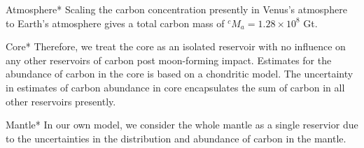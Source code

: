 
Atmosphere*
Scaling the carbon concentration presently in Venus's atmosphere to Earth's atmosphere gives a total carbon mass of $^cM_{a} = 1.28 \times 10^8$ Gt. 

Core*
Therefore, we treat the core as an isolated reservoir with no influence on any other reservoirs of carbon post moon-forming impact. Estimates for the abundance of carbon in the core is based on a chondritic model. The uncertainty in estimates of carbon abundance in core encapsulates the sum of carbon in all other reservoirs presently.

Mantle*
In our own model, we consider the whole mantle as a single reservior due to the uncertainties in the distribution and abundance of carbon in the mantle.